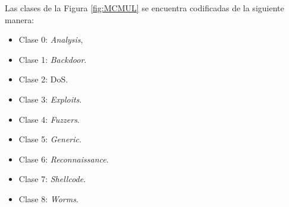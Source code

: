 Las clases de la Figura \ref{fig:MCMUL} se encuentra codificadas de la siguiente manera:

\begin{itemize}
	\item Clase 0: \textit{Analysis},
	\item Clase 1: \textit{Backdoor}.
	\item Clase 2: DoS.
	\item Clase 3: \textit{Exploits}. 
	\item Clase 4: \textit{Fuzzers}.
	\item Clase 5: \textit{Generic}.
	\item Clase 6: \textit{Reconnaissance}.
	\item Clase 7: \textit{Shellcode}.
	\item Clase 8: \textit{Worms}.
\end{itemize}

